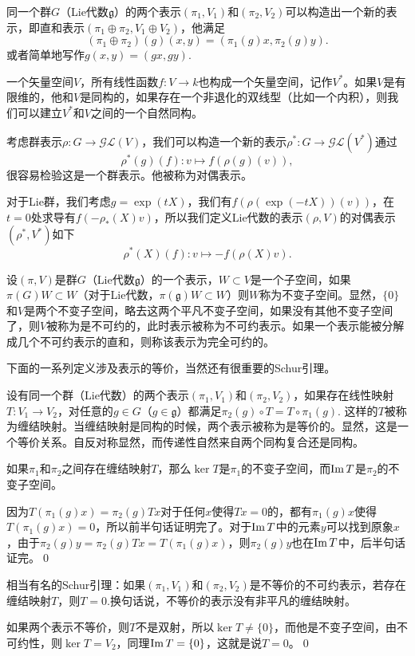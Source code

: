\documentclass[9pt]{extarticle}
\newcommand{\lag}{{\mathfrak{g}}}
\begin{document}
\para 同一个群$G$（Lie代数$\lag$）的两个表示$(\pi_1,V_1)$和$(\pi_2,V_2)$可以构造出一个新的表示，即直和表示$(\pi_1\oplus \pi_2,V_1\oplus V_2)$，他满足
\[
	(\pi_1\oplus \pi_2)(g)(x,y)=(\pi_1(g)x,\pi_2(g)y).
\]
或者简单地写作$g(x,y)=(gx,gy)$.

\para 一个矢量空间$V$，所有线性函数$f:V\to k$也构成一个矢量空间，记作$V^*$。如果$V$是有限维的，他和$V$是同构的，如果存在一个非退化的双线型（比如一个内积），则我们可以建立$V^*$和$V$之间的一个自然同构。

考虑群表示$\rho:G\to \mathcal{GL}(V)$，我们可以构造一个新的表示$\rho^*:G\to \mathcal{GL}(V^*)$通过
\[
	\rho^*(g)(f):v\mapsto f(\rho(g)(v)),
\]
很容易检验这是一个群表示。他被称为对偶表示。

对于Lie群，我们考虑$g=\exp(tX)$，我们有$f(\rho(\exp(-tX))(v))$，在$t=0$处求导有$f(-\rho_*(X)v)$，所以我们定义Lie代数的表示$(\rho,V)$的对偶表示$(\rho^*,V^*)$如下
\[
	\rho^*(X)(f):v\mapsto -f(\rho(X)v).
\]

\para 设$(\pi,V)$是群$G$（Lie代数$\lag$）的一个表示，$W\subset V$是一个子空间，如果$\pi(G)W\subset W$（对于Lie代数，$\pi(\lag)W\subset W$）则$W$称为不变子空间。显然，$\{0\}$和$V$是两个不变子空间，略去这两个平凡不变子空间，如果没有其他不变子空间了，则$V$被称为是不可约的，此时表示被称为不可约表示。如果一个表示能被分解成几个不可约表示的直和，则称该表示为完全可约的。

下面的一系列定义涉及表示的等价，当然还有很重要的Schur引理。

\para 设有同一个群（Lie代数）的两个表示$(\pi_1,V_1)$和$(\pi_2,V_2)$，如果存在线性映射$T:V_1\to V_2$，对任意的$g\in G$（$g\in \lag$）都满足$\pi_2(g)\circ T=T\circ \pi_1(g)$. 这样的$T$被称为缠结映射。当缠结映射是同构的时候，两个表示被称为是等价的。显然，这是一个等价关系。自反对称显然，而传递性自然来自两个同构复合还是同构。

\lem 如果$\pi_1$和$\pi_2$之间存在缠结映射$T$，那么$\ker T$是$\pi_1$的不变子空间，而$\operatorname{Im} T$是$\pi_2$的不变子空间。

\proof 因为$T(\pi_1(g)x)=\pi_2(g)Tx$对于任何$x$使得$Tx=0$的，都有$\pi_1(g)x$使得$T(\pi_1(g)x)=0$，所以前半句话证明完了。对于$\operatorname{Im} T$中的元素$y$可以找到原象$x$，由于$\pi_2(g)y=\pi_2(g)Tx=T(\pi_1(g)x)$，则$\pi_2(g)y$也在$\operatorname{Im} T$中，后半句话证完。\qed

\lem 相当有名的Schur引理：如果$(\pi_1,V_1)$和$(\pi_2,V_2)$是不等价的不可约表示，若存在缠结映射$T$，则$T=0$.换句话说，不等价的表示没有非平凡的缠结映射。

\proof 如果两个表示不等价，则$T$不是双射，所以$\ker T\neq \{0\}$，而他是不变子空间，由不可约性，则$\ker T= V_2$，同理$\operatorname{Im}  T= \{0\}$，这就是说$T=0$。\qed
\end{document}
